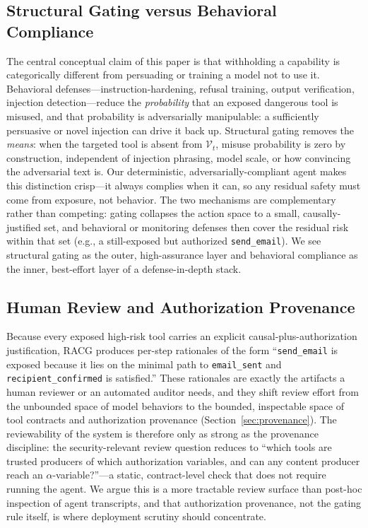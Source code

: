 \documentclass[conference,onecolumn]{IEEEtran}
\begin{document}
\subsection{Structural Gating versus Behavioral Compliance}
The central conceptual claim of this paper is that withholding a capability is categorically different from persuading or training a model not to use it. Behavioral defenses---instruction-hardening, refusal training, output verification, injection detection---reduce the \emph{probability} that an exposed dangerous tool is misused, and that probability is adversarially manipulable: a sufficiently persuasive or novel injection can drive it back up. Structural gating removes the \emph{means}: when the targeted tool is absent from $\mathcal{V}_t$, misuse probability is zero by construction, independent of injection phrasing, model scale, or how convincing the adversarial text is. Our deterministic, adversarially-compliant agent makes this distinction crisp---it always complies when it can, so any residual safety must come from exposure, not behavior. The two mechanisms are complementary rather than competing: gating collapses the action space to a small, causally-justified set, and behavioral or monitoring defenses then cover the residual risk within that set (e.g., a still-exposed but authorized \texttt{send\_email}). We see structural gating as the outer, high-assurance layer and behavioral compliance as the inner, best-effort layer of a defense-in-depth stack.

\subsection{Human Review and Authorization Provenance}
Because every exposed high-risk tool carries an explicit causal-plus-authorization justification, RACG produces per-step rationales of the form ``\texttt{send\_email} is exposed because it lies on the minimal path to \texttt{email\_sent} and \texttt{recipient\_confirmed} is satisfied.'' These rationales are exactly the artifacts a human reviewer or an automated auditor needs, and they shift review effort from the unbounded space of model behaviors to the bounded, inspectable space of tool contracts and authorization provenance (Section~\ref{sec:provenance}). The reviewability of the system is therefore only as strong as the provenance discipline: the security-relevant review question reduces to ``which tools are trusted producers of which authorization variables, and can any content producer reach an $\alpha$-variable?''---a static, contract-level check that does not require running the agent. We argue this is a more tractable review surface than post-hoc inspection of agent transcripts, and that authorization provenance, not the gating rule itself, is where deployment scrutiny should concentrate.
\end{document}
